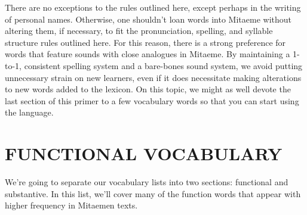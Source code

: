 \documentclass[a4paper, titlepage]{article}
\begin{document}
There are no exceptions to the rules outlined here, except perhaps in the writing of personal names. Otherwise, one shouldn't loan words into Mitaeme without altering them, if necessary, to fit the pronunciation, spelling, and syllable structure rules outlined here. For this reason, there is a strong preference for words that feature sounds with close analogues in Mitaeme. By maintaining a 1-to-1, consistent spelling system and a bare-bones sound system, we avoid putting unnecessary strain on new learners, even if it does necessitate making alterations to new words added to the lexicon. On this topic, we might as well devote the last section of this primer to a few vocabulary words so that you can start using the language.

\section{FUNCTIONAL VOCABULARY}

We're going to separate our vocabulary lists into two sections: functional and substantive. In this list, we'll cover many of the function words that appear with higher frequency in Mitaemen texts.
\end{document}
